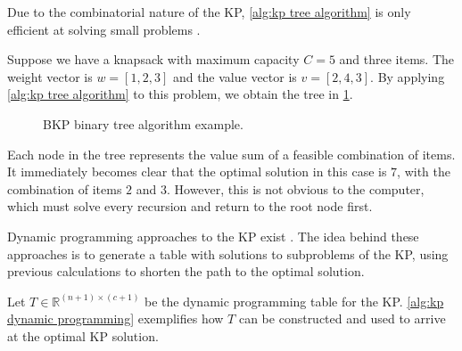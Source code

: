 Due to the combinatorial nature of the KP, \cref{alg:kp tree algorithm} is only efficient at solving small problems \cite{FEOFILOFF2020a}.

\begin{example}
    Suppose we have a knapsack with maximum capacity $C = 5$ and three items. The weight vector is $w = [1, 2, 3]$ and the value vector is $v = [2, 4, 3]$. By applying \cref{alg:kp tree algorithm} to this problem, we obtain the tree in \cref{fig:kp tree example}.

    \begin{figure}[h]
        \centering
        \caption{BKP binary tree algorithm example.}
        \label{fig:kp tree example}
    \end{figure}
    Each node in the tree represents the value sum of a feasible combination of items. It immediately becomes clear that the optimal solution in this case is $7$, with the combination of items $2$ and $3$. However, this is not obvious to the computer, which must solve every recursion and return to the root node first.
\end{example}

Dynamic programming \cite{BRADLEY1977,WAGNER1995} approaches to the KP exist \cite{FEOFILOFF2020a,HRISTAKEVA2005,DEMAINE2011}. The idea behind these approaches is to generate a table with solutions to subproblems of the KP, using previous calculations to shorten the path to the optimal solution.

Let $T \in \mathbb{R}^{(n+1) \times (c+1)}$ be the dynamic programming table for the KP. \cref{alg:kp dynamic programming} exemplifies how $T$ can be constructed and used to arrive at the optimal KP solution.

